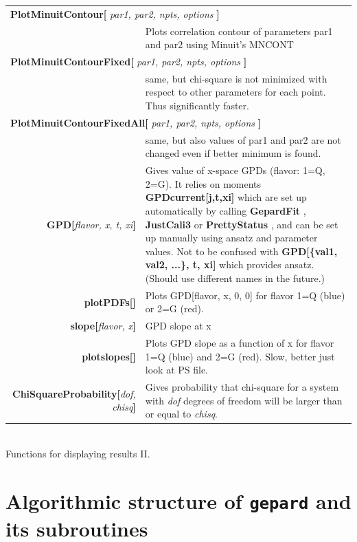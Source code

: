 \documentclass[12pt]{article}
\newcommand{\defboxitem}[3]{ {\ttfamily \bfseries #1[}\emph{#2}{\ttfamily \bfseries ]} & #3 }
\newcommand{\mmacomm}[1]{ {\ttfamily \bfseries #1} }
\begin{document}
\begin{flushleft}
\colorbox{defbox}{%
\begin{minipage}{\textwidth}%
\begin{tabular}{rp{8cm}}%
\multicolumn{2}{l}{\mmacomm{PlotMinuitContour[}\emph{par1, par2, npts, options}
\mmacomm{]} } \\
 & Plots correlation contour
of parameters par1 and par2 using Minuit's MNCONT \\[0.8ex]
\multicolumn{2}{l}{\mmacomm{PlotMinuitContourFixed[}\emph{par1, par2, npts, options}
\mmacomm{]} } \\
& same, but chi-square
is not minimized with respect to other parameters for each point. Thus
significantly faster. \\[0.8ex]
\multicolumn{2}{l}{\mmacomm{PlotMinuitContourFixedAll[}\emph{par1, par2, npts, options}
\mmacomm{]} } \\
& same, but
also values of par1 and par2 are not changed even if better minimum is found. \\[0.8ex]
\defboxitem{GPD}{flavor, x, t, xi}{Gives value of x-space GPDs (flavor: 1=Q, 2=G). 
It relies on moments \mmacomm{GPDcurrent[j,t,xi]} which are set up automatically
by calling \mmacomm{GepardFit}, \mmacomm{JustCali3} or \mmacomm{PrettyStatus}, and can
be set up manually using ansatz and parameter values. Not to be confused with
\mmacomm{GPD[\{val1, val2, ...\}, t, xi]} which provides ansatz. (Should use
different names in the future.)} \\[0.8ex]
\defboxitem{plotPDFs}{}{Plots GPD[flavor, x, 0, 0] for flavor 1=Q (blue) 
or 2=G (red).} \\[0.8ex]
\defboxitem{slope}{flavor, x}{GPD slope at x} \\[0.8ex]
\defboxitem{plotslopes}{}{Plots GPD slope as a function of x for flavor 1=Q (blue) and
 2=G (red). Slow, better just look at PS file.} \\[0.8ex]
\defboxitem{ChiSquareProbability}{dof, chisq}{Gives probability that chi-square
for a system with \emph{dof} degrees of freedom will be larger than or equal to \emph{chisq}.}
\end{tabular}%
\end{minipage}}\\[0.5ex]
{\small Functions for displaying results II.}
\end{flushleft}

\section{Algorithmic structure of \texttt{gepard} and its subroutines}
\end{document}
